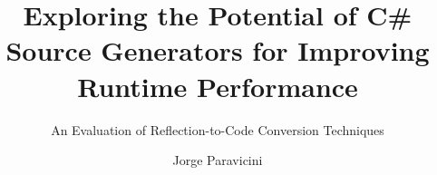 \title{Exploring the Potential of C\# Source Generators for Improving Runtime Performance}
\subtitle{An Evaluation of Reflection-to-Code Conversion Techniques} %
\author{Jorge Paravicini}
